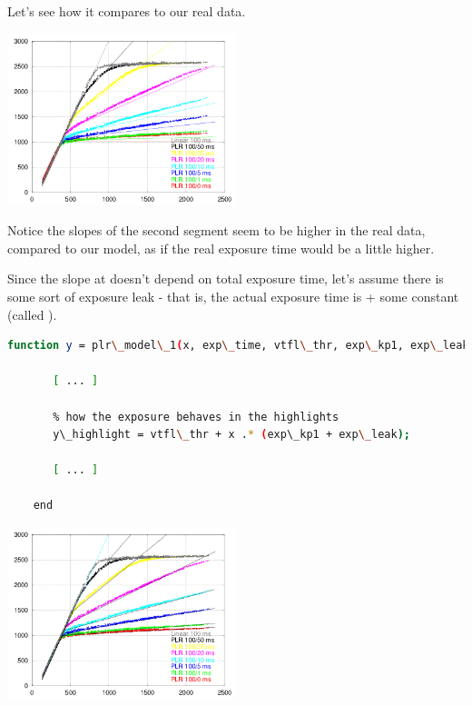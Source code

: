 Let's see how it compares to our real data. \\

\begin{center}
\includegraphics[height=5cm]{images/100-x-32-plr-vs-30ms-lin-model0}
\end{center}

Notice the slopes of the second segment seem to be higher in the real data, compared to our model, as if the real exposure time would be a little higher.

Since the slope at  doesn't depend on total exposure time, let's assume there is some sort of exposure leak - that is, the actual exposure time is  + some constant (called  ). 


\begin{lstlisting}[language=bash,morekeywords=$,keywordstyle=\bfseries,frame=none,xleftmargin=.25in,belowskip=2em, aboveskip=2em]
    function y = plr\_model\_1(x, exp\_time, vtfl\_thr, exp\_kp1, exp\_leak)
      
       [ ... ]  
      
       % how the exposure behaves in the highlights
       y\_highlight = vtfl\_thr + x .* (exp\_kp1 + exp\_leak);
      
       [ ... ]  
      
    end
\end{lstlisting}

\begin{center}
\includegraphics[height=5cm]{images/100-x-32-plr-vs-30ms-lin-model1}
\end{center}

